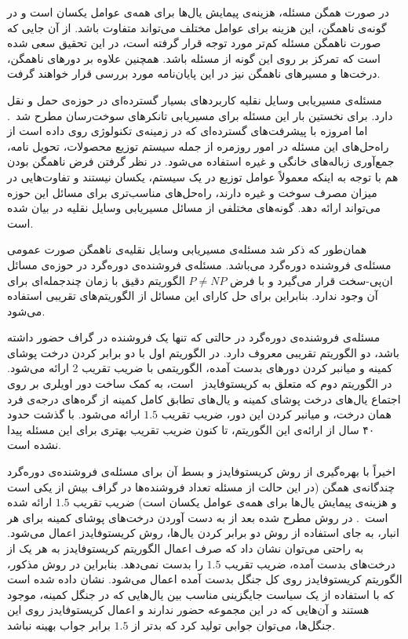 در صورت همگن مسئله، هزینه‌ی پیمایش یال‌ها برای همه‌ی عوامل یکسان است و در گونه‌ی ناهمگن،
این هزینه برای عوامل مختلف می‌تواند متفاوت باشد. 
از آن‌ جایی که صورت ناهمگن مسئله کم‌تر مورد توجه قرار گرفته است،
در این تحقیق سعی شده است که تمرکز بر روی این گونه از مسئله باشد.
همچنین علاوه بر دورهای ناهمگن، درخت‌ها و مسیرهای ناهمگن نیز در این پایان‌نامه مورد بررسی قرار خواهند گرفت.


مسئله‌ی مسیریابی وسایل نقلیه کاربردهای بسیار گسترده‌ای در حوزه‌ی حمل و نقل دارد. برای نخستین بار این مسئله برای مسیریابی تانکرهای سوخت‌رسان مطرح شد~\cite{Dantzig}. اما امروزه با پیشرفت‌های گسترده‌ای که در زمینه‌ی تکنولوژی روی داده است از راه‌حل‌های این مسئله در امور روزمره از جمله سیستم توزیع محصولات، تحویل نامه، جمع‌آوری زباله‌های خانگی و غیره استفاده می‌شود. در نظر گرفتن فرض ناهمگن بودن هم با توجه به اینکه معمولاً عوامل توزیع در یک سیستم، یکسان نیستند و تفاوت‌هایی در میزان مصرف سوخت و غیره دارند، راه‌حل‌های مناسب‌تری برای مسائل این حوزه می‌تواند ارائه دهد.
گونه‌های مختلفی از مسائل مسیریابی وسایل نقلیه در 
بیان شده است.




همان‌طور که ذکر شد مسئله‌ی مسیریابی وسایل نقلیه‌ی ناهمگن صورت عمومی مسئله‌ی فروشنده دوره‌گرد می‌باشد. 
مسئله‌ی فروشنده‌ی دوره‌گرد در حوزه‌ی مسائل ان‌پی-سخت قرار می‌گیرد و با فرض $P \neq NP$ الگوریتم دقیق با زمان چندجمله‌ای برای آن وجود ندارد. بنابراین برای حل کارای این مسائل از الگوریتم‌های تقریبی  استفاده می‌شود.

مسئله‌ی فروشنده‌ی دوره‌گرد در حالتی که تنها یک فروشنده در گراف حضور داشته باشد، دو الگوریتم تقریبی معروف دارد.
در الگوریتم اول با دو برابر کردن درخت پوشای کمینه و میانبر کردن دورهای بدست آمده، الگوریتمی با ضریب تقریب 2 ارائه می‌شود.
در الگوریتم دوم که متعلق به کریستوفایدز~\cite{Christofides} است، به کمک ساخت دور اویلری بر روی اجتماع یال‌های درخت پوشای کمینه و یال‌های تطابق کامل کمینه از گره‌های درجه‌ی فرد همان درخت، و میانبر کردن این دور، ضریب تقریب $1.5$  ارائه می‌شود.
با گذشت حدود ۴۰ سال از ارائه‌ی این الگوریتم، تا کنون 
ضریب تقریب بهتری برای این مسئله پیدا نشده است.

اخیراً با بهره‌گیری از روش کریستوفایدز و بسط آن برای مسئله‌ی فروشنده‌ی دوره‌گرد چندگانه‌ی همگن (در این حالت از مسئله تعداد فروشنده‌ها در گراف بیش از یکی است و هزینه‌ی پیمایش یال‌ها برای همه‌ی عوامل یکسان است) ضریب تقریب $1.5$ ارائه شده است~\cite{Xu}. در روش مطرح شده بعد از به دست آوردن درخت‌های پوشای کمینه برای هر انبار، به جای استفاده از روش دو برابر کردن یال‌ها، روش کریستوفایدز اعمال می‌شود. به راحتی می‌توان نشان داد که صرف اعمال الگوریتم کریستوفایدز به هر یک از درخت‌های بدست آمده، ضریب تقریب  $1.5$ را بدست نمی‌دهد. بنابراین در روش مذکور، الگوریتم کریستوفایدز روی کل جنگل بدست آمده اعمال می‌شود. نشان داده شده است که با استفاده از یک سیاست جایگزینی مناسب بین یال‌هایی که در جنگل کمینه، موجود هستند و آن‌هایی که در این مجموعه حضور ندارند و اعمال کریستوفایدز روی این جنگل‌ها، می‌توان جوابی تولید کرد که بدتر از $1.5$ برابر جواب بهینه نباشد.


